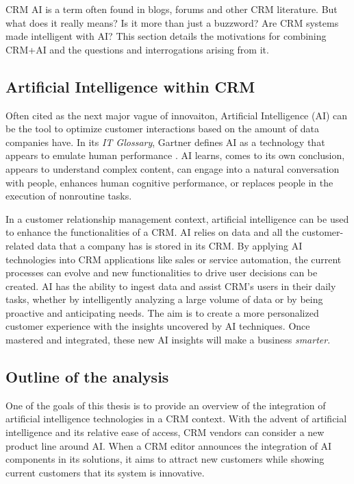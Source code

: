 CRM AI is a term often found in blogs, forums and other CRM literature. But what does it really means? Is it more than just a buzzword? Are CRM systems made intelligent with AI? This section details the motivations for combining CRM+AI and the questions and interrogations arising from it.

\subsection{Artificial Intelligence within CRM}

Often cited as the next major vague of innovaiton, Artificial Intelligence (AI) can be the tool to optimize customer interactions based on the amount of data companies have. In its \textit{IT Glossary}, Gartner defines AI as a technology that appears to emulate human performance \cite{gartner-glossary}. AI learns, comes to its own conclusion, appears to understand complex content, can engage into a natural conversation with people, enhances human cognitive performance, or replaces people in the execution of nonroutine tasks.

In a customer relationship management context, artificial intelligence can be used to enhance the functionalities of a CRM. AI relies on data and all the customer-related data that a company has is stored in its CRM. By applying AI technologies into CRM applications like sales or service automation, the current processes can evolve and new functionalities to drive user decisions can be created. AI has the ability to ingest data and assist CRM's users in their daily tasks, whether by intelligently analyzing a large volume of data or by being proactive and anticipating needs. The aim is to create a more personalized customer experience with the insights uncovered by AI techniques. Once mastered and integrated, these new AI insights will make a business \textit{smarter}.


\subsection{Outline of the analysis}
One of the goals of this thesis is to provide an overview of the integration of artificial intelligence technologies in a CRM context. With the advent of artificial intelligence and its relative ease of access, CRM vendors can consider a new product line around AI. When a CRM editor announces the integration of AI components in its solutions, it aims to attract new customers while showing current customers that its system is innovative.

